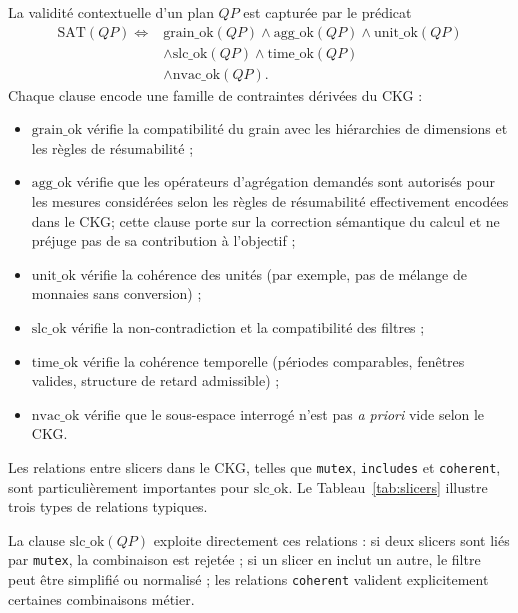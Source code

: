 \documentclass[journal]{IEEEtran}
\begin{document}
La validité contextuelle d'un plan $QP$ est capturée par le prédicat
\begin{equation}
\label{eq:sat}
\begin{aligned}
\mathrm{SAT}(QP) \Leftrightarrow {} & \mathrm{grain\_ok}(QP)\wedge \mathrm{agg\_ok}(QP)\wedge \mathrm{unit\_ok}(QP) \\
& \wedge \mathrm{slc\_ok}(QP)\wedge \mathrm{time\_ok}(QP) \\
& \wedge \mathrm{nvac\_ok}(QP).
\end{aligned}
\end{equation}
Chaque clause encode une famille de contraintes dérivées du CKG :
\begin{itemize}
  \item $\mathrm{grain\_ok}$ vérifie la compatibilité du grain avec les hiérarchies de dimensions et les règles de résumabilité ;
  \item $\mathrm{agg\_ok}$ vérifie que les opérateurs d'agrégation demandés sont autorisés pour les mesures considérées selon les règles de résumabilité effectivement encodées dans le CKG; cette clause porte sur la correction sémantique du calcul et ne préjuge pas de sa contribution à l'objectif ;
  \item $\mathrm{unit\_ok}$ vérifie la cohérence des unités (par exemple, pas de mélange de monnaies sans conversion) ;
  \item $\mathrm{slc\_ok}$ vérifie la non-contradiction et la compatibilité des filtres ;
  \item $\mathrm{time\_ok}$ vérifie la cohérence temporelle (périodes comparables, fenêtres valides, structure de retard admissible) ;
  \item $\mathrm{nvac\_ok}$ vérifie que le sous-espace interrogé n'est pas \emph{a priori} vide selon le CKG.
\end{itemize}

Les relations entre slicers dans le CKG, telles que \texttt{mutex}, \texttt{includes} et \texttt{coherent}, sont particulièrement importantes pour $\mathrm{slc\_ok}$. Le Tableau~\ref{tab:slicers} illustre trois types de relations typiques.



La clause $\mathrm{slc\_ok}(QP)$ exploite directement ces relations : si deux slicers sont liés par \texttt{mutex}, la combinaison est rejetée ; si un slicer en inclut un autre, le filtre peut être simplifié ou normalisé ; les relations \texttt{coherent} valident explicitement certaines combinaisons métier.
\end{document}
